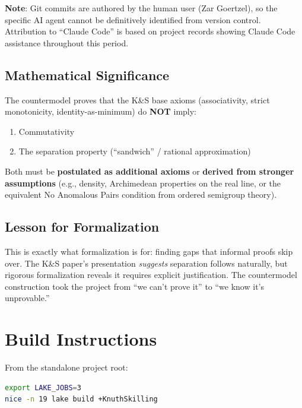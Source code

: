 \documentclass[11pt]{article}
\theoremstyle{definition}
\theoremstyle{remark}
\begin{document}
\textbf{Note}: Git commits are authored by the human user (Zar Goertzel), so the specific AI
agent cannot be definitively identified from version control. Attribution to ``Claude Code''
is based on project records showing Claude Code assistance throughout this period.

\subsection*{Mathematical Significance}

The countermodel proves that the K\&S base axioms (associativity, strict monotonicity,
identity-as-minimum) do \textbf{NOT} imply:
\begin{enumerate}
\item Commutativity
\item The separation property (``sandwich'' / rational approximation)
\end{enumerate}

Both must be \textbf{postulated as additional axioms} or \textbf{derived from stronger
assumptions} (e.g., density, Archimedean properties on the real line, or the equivalent
No Anomalous Pairs condition from ordered semigroup theory).

\subsection*{Lesson for Formalization}

This is exactly what formalization is for: finding gaps that informal proofs skip over.
The K\&S paper's presentation \textit{suggests} separation follows naturally, but rigorous
formalization reveals it requires explicit justification. The countermodel construction
took the project from ``we can't prove it'' to ``we know it's unprovable.''

\section{Build Instructions}

From the standalone project root:

\begin{lstlisting}[language=bash]
export LAKE_JOBS=3
nice -n 19 lake build +KnuthSkilling
\end{lstlisting}
\end{document}
